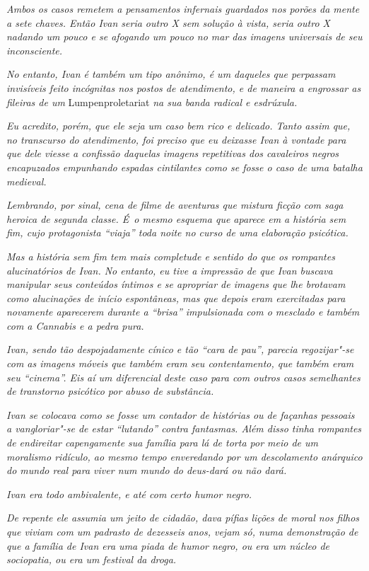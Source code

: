 \emph{Ambos os casos remetem a pensamentos infernais guardados nos
porões da mente a sete chaves. Então Ivan seria outro X sem solução à
vista, seria outro X nadando um pouco e se afogando um pouco no mar das
imagens universais de seu inconsciente.}

\emph{No entanto, Ivan é também um tipo anônimo, é um daqueles que
perpassam invisíveis feito incógnitas nos postos de atendimento, e de
maneira a engrossar as fileiras de um} Lumpenproletariat \emph{na sua banda
radical e esdrúxula.}

\emph{Eu acredito, porém, que ele seja um caso bem rico e delicado.
Tanto assim que, no transcurso do atendimento, foi preciso que eu
deixasse Ivan à vontade para que dele viesse a confissão daquelas
imagens repetitivas dos cavaleiros negros encapuzados empunhando espadas
cintilantes como se fosse o caso de uma batalha medieval.}

\emph{Lembrando, por sinal, cena de filme  de aventuras que mistura
ficção com saga heroica de segunda classe. É~o mesmo esquema que aparece
em a história sem fim, cujo protagonista ``viaja'' toda noite no curso de
uma elaboração psicótica.}

\emph{Mas a história sem fim tem mais completude e sentido do que os
rompantes alucinatórios de Ivan. No entanto, eu tive a impressão de que
Ivan buscava manipular seus conteúdos íntimos e se apropriar de imagens
que lhe brotavam como alucinações de início espontâneas, mas que depois
eram exercitadas para novamente aparecerem durante a ``brisa''
impulsionada com o mesclado e também com a Cannabis e a pedra pura.}

\emph{Ivan, sendo tão despojadamente cínico e tão ``cara de pau'',
parecia regozijar"-se com as imagens móveis que também eram seu
contentamento, que também eram seu ``cinema''. Eis aí um diferencial
deste caso para com outros casos semelhantes de transtorno psicótico por
abuso de substância.}

\emph{Ivan se colocava como se fosse um contador de histórias ou de
façanhas pessoais a vangloriar"-se de estar ``lutando'' contra fantasmas.
Além disso tinha rompantes de endireitar capengamente sua família para
lá de torta por meio de um moralismo ridículo, ao mesmo tempo
enveredando por um descolamento anárquico do mundo real para viver num
mundo do deus-dará ou não dará.}

\emph{Ivan era todo ambivalente, e até com certo humor negro.}

\emph{De repente ele assumia um jeito de cidadão, dava pífias lições de
moral nos filhos que viviam com um padrasto de dezesseis anos, vejam só,
numa demonstração de que a família de Ivan era uma piada de humor negro,
ou era um núcleo de sociopatia, ou era um festival da droga.}

